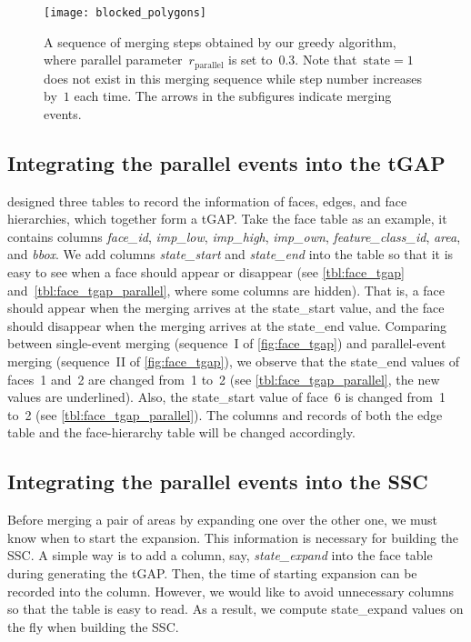 \documentclass[ijgi,article,submit,moreauthors,pdftex]{Definitions/mdpi}
\begin{document}
\begin{figure}[tb]
\centering
\texttt{[image: blocked\_polygons]}
\caption{A sequence of merging steps obtained by our greedy algorithm,
	where parallel parameter~$r_\mathrm{parallel}$ is set to~$0.3$.
    Note that~$\mathrm{state}=1$ does not exist in this merging sequence
    while step number increases by~$1$ each time.
	The arrows in the subfigures indicate merging events.
}
\label{fig:sequence_greedy}
\end{figure}




\subsection{Integrating the parallel events into the tGAP}
\label{sec:integrate_tgap}

\citet[]{Meijers2011Thesis} designed three tables 
to record the information of
faces, edges, and face hierarchies, 
which together form a tGAP.
Take the face table as an example,
it contains columns \emph{face\_id}, 
\emph{imp\_low}, \emph{imp\_high}, \emph{imp\_own},
\emph{feature\_class\_id}, \emph{area}, and \emph{bbox}.
We add columns \emph{state\_start} and \emph{state\_end} into the table 
so that it is easy to see when a face should appear or disappear 
(see \tbls\ref{tbl:face_tgap} and~\ref{tbl:face_tgap_parallel},
where some columns are hidden).
That is, a face should appear
when the merging arrives at the state\_start value,
and the face should disappear
when the merging arrives at the state\_end value.
Comparing between single-event merging 
(sequence~I of \fig\ref{fig:face_tgap})
and parallel-event merging (sequence~II of \fig\ref{fig:face_tgap}),
we observe that the state\_end values of faces~1 and~2 are changed from~1 to~2
(see \tbl\ref{tbl:face_tgap_parallel}, the new values are underlined).
Also, the state\_start value of face~6 is changed from~1 to~2
(see \tbl\ref{tbl:face_tgap_parallel}).
The columns and records of both the edge table and the face-hierarchy table 
will be changed accordingly.


\subsection{Integrating the parallel events into the SSC}

Before merging a pair of areas by expanding one over the other one,
we must know when to start the expansion.
This information is necessary for building the SSC.
A simple way is to add a column, say, \emph{state\_expand} 
into the face table during generating the tGAP.
Then, the time of starting expansion can be recorded into the column.
However, we would like to avoid unnecessary columns
so that the table is easy to read.
As a result, we compute state\_expand values on the fly 
when building the SSC.
\end{document}
